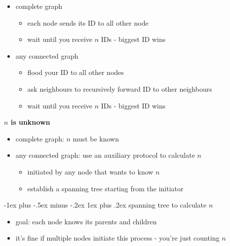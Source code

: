 \documentclass[10pt, landscape]{article}
\makeatletter
\renewcommand{\subsubsection}{\@startsection{subsubsection}{3}{0mm}%
  {-1ex plus -.5ex minus -.2ex}%
  {1ex plus .2ex}%
{\normalfont\small\bfseries}}%
\makeatother
\begin{document}
\begin{multicols*}{3}
  \begin{itemize}
    \item complete graph
      \begin{itemize}
        \item each node sends its ID to all other node
        \item wait until you receive $n$ IDs - biggest ID wins
      \end{itemize}
    \item any connected graph
      \begin{itemize}
        \item flood your ID to all other nodes
        \item ask neighbours to recursively forward ID to other neighbours
        \item wait until you receive $n$ IDs - biggest ID wins
      \end{itemize}
  \end{itemize}

  \textbf{$n$ is unknown}

  \begin{itemize}
    \item complete graph: $n$ must be known
    \item any connected graph: use an auxiliary protocol to calculate $n$
      \begin{itemize}
        \item initiated by any node that wants to know $n$
        \item establish a spanning tree starting from the initiator
      \end{itemize}
  \end{itemize}

  \subsubsection{spanning tree to calculate $n$}

  \begin{itemize}
    \item goal: each node knows its parents and children
    \item it's fine if multiple nodes initiate this process - you're just counting $n$
  \end{itemize}


\end{multicols*}
\end{document}
